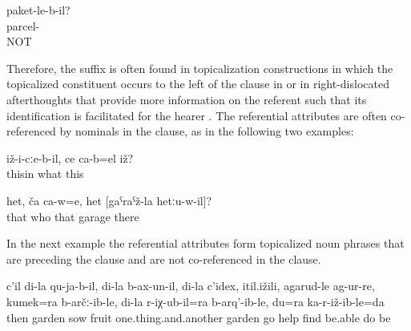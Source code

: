 \begin{exe}
	\ex	\label{ex:The (thing) in the parcel?}
	\gll	paket-le-b-il?\\
		parcel-\\
	\glt	{} NOT 
\end{exe}

Therefore, the suffix is often found in topicalization constructions in which the topicalized constituent occurs to the left of the clause in  or in right-dislocated afterthoughts that provide more information on the referent such that its identification is facilitated for the hearer . The referential attributes are often co-referenced by nominals in the clause, as in the following two examples:

\begin{exe}
	\ex	\label{ex:‎This in it (i.e. his hand), what is it minor}
	\gll	iž-i-cːe-b-il,	ce	ca-b=el	iž?\\
		thisin	what		this\\
	\glt	{}
	
	\ex	\label{ex:He, who is it, the one of the garage there minor}
	\gll	het,	ča 	ca-w=e,	het	[gaˁraˁž-la	hetːu-w-il]?\\
		that	who		that	garage	there\\
	\glt	{}
	
\end{exe}

In the next example  the referential attributes form topicalized noun phrases that are preceding the clause and are not co-referenced in the clause.
%
\begin{exe}
	\ex	\label{ex:‎Then, for my fields, my sown fields, my fruits, all the stuff, I went to the garden, I found help}
	\gll	c'il	di-la	qu-ja-b-il,	di-la	b-ax-un-il,	di-la	c'idex,	itil.ižili,	agarud-le ag-ur-re, kumek=ra	b-arčː-ib-le,	di-la	r-iχ-ub-il=ra	b-arq'-ib-le,	du=ra	ka-r-iž-ib-le=da\\
		then		garden		sow		fruit		one.thing.and.another	garden	go\tsc{.pfv-pret-cvb}	help	find		be.able	do		be\\
	\glt	{}
\end{exe}
%

